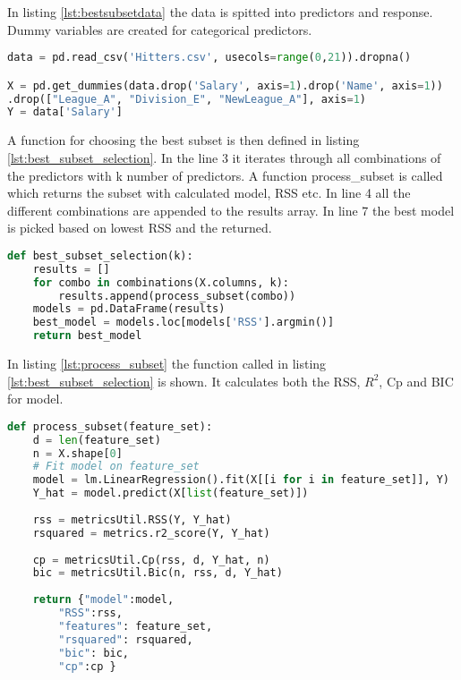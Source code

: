 In listing \ref{lst:bestsubsetdata} the data is spitted into predictors and response. Dummy variables are created for categorical predictors.

\begin{lstlisting}[language=Python, label=lst:bestsubsetdata, caption=Data is splitet into predictors and response]
data = pd.read_csv('Hitters.csv', usecols=range(0,21)).dropna()

X = pd.get_dummies(data.drop('Salary', axis=1).drop('Name', axis=1))
.drop(["League_A", "Division_E", "NewLeague_A"], axis=1)
Y = data['Salary']
\end{lstlisting}


A function for choosing the best subset is then defined in listing \ref{lst:best_subset_selection}. In the line 3 it iterates through all combinations of the predictors with k number of predictors. A function process\_subset is called which returns the subset with calculated model, RSS etc. In line 4 all the different combinations are appended to the results array. In line 7 the best model is picked based on lowest RSS and the returned.

\begin{lstlisting}[language=Python, label=lst:best_subset_selection, caption=function for choosing best subset]
def best_subset_selection(k):
	results = []
	for combo in combinations(X.columns, k):
		results.append(process_subset(combo))
	models = pd.DataFrame(results)
	best_model = models.loc[models['RSS'].argmin()]
	return best_model
\end{lstlisting}

In listing \ref{lst:process_subset} the function called in listing \ref{lst:best_subset_selection} is shown. It calculates both the RSS, $R^2$, Cp and BIC for model.

\begin{lstlisting}[language=Python, label=lst:process_subset, caption=Calculating metrics for subset]
def process_subset(feature_set):
	d = len(feature_set)
	n = X.shape[0]
	# Fit model on feature_set  
	model = lm.LinearRegression().fit(X[[i for i in feature_set]], Y)
	Y_hat = model.predict(X[list(feature_set)])
	
	rss = metricsUtil.RSS(Y, Y_hat)  
	rsquared = metrics.r2_score(Y, Y_hat)
	
	cp = metricsUtil.Cp(rss, d, Y_hat, n)
	bic = metricsUtil.Bic(n, rss, d, Y_hat)
	
	return {"model":model, 
		"RSS":rss,
		"features": feature_set,
		"rsquared": rsquared,
		"bic": bic,
		"cp":cp }
\end{lstlisting}

